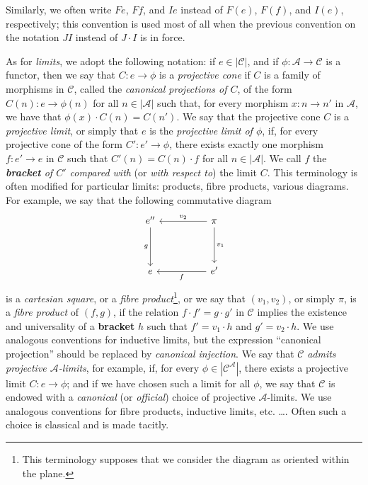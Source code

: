 \documentclass{article}
\newcommand{\oldpage}[1]{\marginpar{\footnotesize$\Big\vert$ \textit{p.~#1}}}
\newcommand{\unsure}[1]{{\color{purple}\textbf{#1}}}
\newcommand{\cat}[1]{\mathcal{#1}}
\newcommand{\set}[1]{|#1|}
\begin{document}
Similarly, we often write $Fe$, $Ff$, and $Ie$ instead of $F(e)$, $F(f)$, and $I(e)$, respectively; this convention is used most of all when the previous convention on the notation $JI$ instead of $J\cdot I$ is in force.

As for \emph{limits}, we adopt the following notation: if $e\in\set{\cat{C}}$, and if $\phi\colon \cat{A}\to\cat{C}$ is a functor, then we say that $C\colon e\to\phi$ is a \emph{projective cone} if $C$ is a family of morphisms in $\cat{C}$, called the \emph{canonical projections of $C$}, of the form $C(n)\colon e\to\phi(n)$ for all $n\in\set{\cat{A}}$ such that, for every morphism $x\colon n\to n'$ in $\cat{A}$, we have that $\phi(x)\cdot C(n)=C(n')$.
We say that the projective cone $C$ is a \emph{projective limit}, or simply that $e$ is the \emph{projective limit of $\phi$}, if, for every projective cone of the form $C'\colon e'\to\phi$, there exists exactly one morphism $f\colon e'\to e$ in $\cat{C}$ such that $C'(n)=C(n)\cdot f$ for all $n\in\set{\cat{A}}$.
We call $f$ the \emph{\unsure{bracket} of $C'$ compared with} (or \emph{with respect to}) the limit $C$.
This terminology is often modified for particular limits: products, fibre products, various diagrams.
For example, we say that the following commutative diagram
\oldpage{222}
\[
  \begin{tikzcd}[sep=huge]
    e'' \ar[d,swap,"g"]
  & \pi \ar[l,swap,"v_2"] \ar[d,"v_1"]
  \\e
  & e' \ar[l,"f"]
  \end{tikzcd}
\]
is a \emph{cartesian square}, or a \emph{fibre product}\footnote{This terminology supposes that we consider the diagram as oriented within the plane.}, or we say that $(v_1,v_2)$, or simply $\pi$, is a \emph{fibre product} of $(f,g)$, if the relation $f\cdot f'=g\cdot g'$ in $\cat{C}$ implies the existence and universality of a \unsure{bracket} $h$ such that $f'=v_1\cdot h$ and $g'=v_2\cdot h$.
We use analogous conventions for inductive limits, but the expression ``canonical projection''  should be replaced by \emph{canonical injection}.
We say that $\cat{C}$ \emph{admits projective $\cat{A}$-limits}, for example, if, for every $\phi\in\set{\cat{C}^\cat{A}}$, there exists a projective limit $C\colon e\to\phi$;
and if we have chosen such a limit for all $\phi$, we say that $\cat{C}$ is endowed with a \emph{canonical} (or \emph{official}) choice of projective $\cat{A}$-limits.
We use analogous conventions for fibre products, inductive limits, etc. \ldots.
Often such a choice is classical and is made tacitly.
\end{document}

